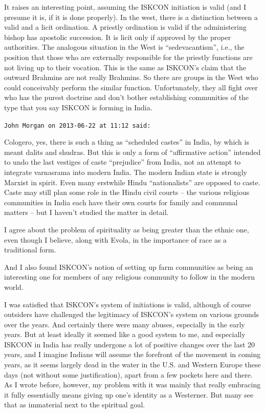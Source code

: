 \begin{footnotesize}
\begin{sffamily}
It raises an interesting point, assuming the ISKCON initiation is valid (and I presume it is, if it is done properly). In the west, there is a distinction between a valid and a licit ordination. A priestly ordination is valid if the administering bishop has apostolic succession. It is licit only if approved by the proper authorities. The analogous situation in the West is ``sedevacantism'', i.e., the position that those who are externally responsible for the priestly functions are not living up to their vocation. This is the same as ISKCON's claim that the outward Brahmins are not really Brahmins. So there are groups in the West who could conceivably perform the similar function. Unfortunately, they all fight over who has the purest doctrine and don't bother establishing communities of the type that you say ISKCON is forming in India.

\hfill

\texttt{John Morgan on 2013-06-22 at 11:12 said:}

Cologero, yes, there is such a thing as ``scheduled castes'' in India, by which is meant dalits and shudras. But this is only a form of ``affirmative action'' intended to undo the last vestiges of caste ``prejudice'' from India, not an attempt to integrate varnasrama into modern India. The modern Indian state is strongly Marxist in spirit. Even many erstwhile Hindu ``nationalists'' are opposed to caste. Caste may still plan some role in the Hindu civil courts -- the various religious communities in India each have their own courts for family and communal matters -- but I haven't studied the matter in detail.

I agree about the problem of spirituality as being greater than the ethnic one, even though I believe, along with Evola, in the importance of race as a traditional form.

And I also found ISKCON's notion of setting up farm communities as being an interesting one for members of any religious community to follow in the modern world.

I was satisfied that ISKCON's system of initiations is valid, although of course outsiders have challenged the legitimacy of ISKCON's system on various grounds over the years. And certainly there were many abuses, especially in the early years. But at least ideally it seemed like a good system to me, and especially ISKCON in India has really undergone a lot of positive changes over the last 20 years, and I imagine Indians will assume the forefront of the movement in coming years, as it seems largely dead in the water in the U.S. and Western Europe these days (not without some justification), apart from a few pockets here and there. As I wrote before, however, my problem with it was mainly that really embracing it fully essentially means giving up one's identity as a Westerner. But many see that as immaterial next to the spiritual goal.


\end{sffamily}
\end{footnotesize}
